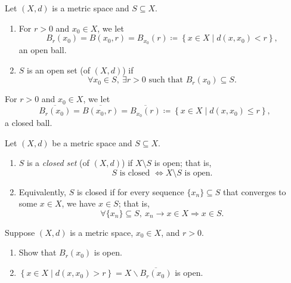 \begin{definition}
    Let \((X,d)\) is a metric space and \(S \subseteq X\). 
    \begin{enumerate}
        \item For \(r > 0\) and \(x_0 \in X\), we let
        \[
            B_r(x_0)=B(x_0,r)=B_{x_0}(r)\coloneqq \left\{ x \in X \mid d(x,x_0) < r \right\},
        \] an open ball. 
        \item \(S\) is an open set (of \((X,d)\)) if
        \[
            \forall x_0 \in S, \ \exists r>0 \text{ such that } B_r(x_0) \subseteq S. 
        \]  
    \end{enumerate}  
\end{definition}
\begin{definition}
   For \(r > 0\) and \(x_0 \in X\), we let
        \[
            \overline{B_r(x_0)} =\overline{B(x_0,r)} =\overline{B_{x_0}(r)} \coloneqq \left\{ x \in X \mid d(x,x_0) \le r \right\},
        \] a closed ball. 
\end{definition}
\begin{definition}
    Let \((X,d)\) be a metric space and \(S \subseteq X\). 
    \begin{enumerate}
        \item \(S\) is a \emph{closed set} (of \((X,d)\)) if \(X \setminus S\) is open; that is,
        \[
            S \text{ is closed } \iff X \setminus S \text{ is open}.
        \]
        \item Equivalently, \(S\) is closed if for every sequence \(\{x_n\} \subseteq S\) that converges to some \(x \in X\), we have \(x \in S\); that is,
        \[
            \forall \{x_n\} \subseteq S, \ x_n \to x \in X \Rightarrow x \in S.
        \]
    \end{enumerate}
\end{definition}

\begin{exercise}
    Suppose \((X,d)\) is a metric space, \(x_0 \in X\), and \(r>0\).  
    \begin{enumerate}
        \item Show that \(B_r(x_0)\) is open. 
        \item \(\left\{ x \in X \mid d(x, x_0) > r \right\} = X \backslash \overline{B_r(x_0)} \) is open. 
    \end{enumerate} 

\end{exercise}